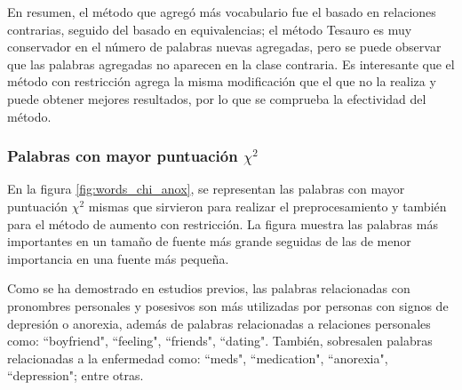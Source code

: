 En resumen, el método que agregó más vocabulario fue el basado en relaciones contrarias, seguido del basado en equivalencias; el método Tesauro es muy conservador en el número de palabras nuevas agregadas, pero se puede observar que las palabras agregadas no aparecen en la clase contraria. Es interesante que el método con restricción agrega la misma modificación que el que no la realiza y puede obtener mejores resultados, por lo que se comprueba la efectividad del método. 



\subsubsection{Palabras con mayor puntuación $\chi^2$}
En la figura \ref{fig:words_chi_anox}, se representan las palabras con mayor puntuación $\chi^2$ mismas que sirvieron para realizar el preprocesamiento y también para el método de aumento con restricción. La figura muestra las palabras más importantes en un tamaño de fuente más grande seguidas de las de menor importancia en una fuente más pequeña. 

Como se ha demostrado en estudios previos, las palabras relacionadas con pronombres personales y posesivos son más utilizadas por personas con signos de depresión o anorexia, además de palabras relacionadas a relaciones personales como: ``boyfriend", ``feeling", ``friends", ``dating". También, sobresalen palabras relacionadas a la enfermedad como: ``meds", ``medication", ``anorexia", ``depression"; entre otras.



